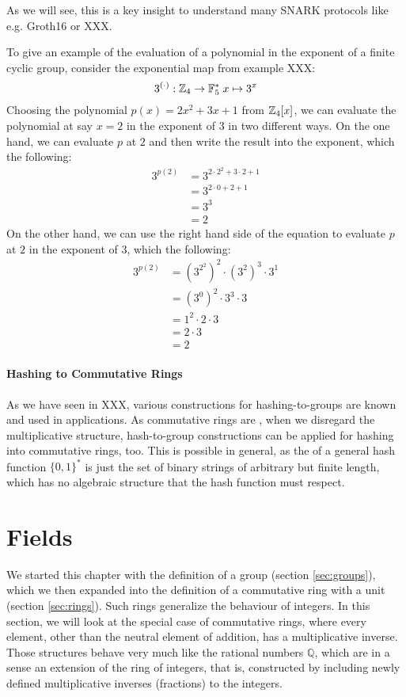 As we will see, this is a key insight to understand many SNARK protocols like e.g. Groth16 \citep{Groth16} or XXX.
\begin{example} To give an example of the evaluation of a polynomial in the exponent of a finite cyclic group, consider the exponential map from example XXX:
$$
3^{(\cdot)}: \mathbb{Z}_4 \to \mathbb{F}_5^* \; x \mapsto 3^x
$$
 Choosing the polynomial $p(x)= 2x^2 +3x +1$ from $\mathbb{Z}_4[x]$, we can evaluate the polynomial at say $x=2$ in the exponent of $3$ in two different ways. On the one hand, we can evaluate $p$ at $2$ and then write the result into the exponent, which  the following:
\begin{align*}
3^{p(2)} &=3^{2\cdot 2^2+3\cdot 2 +1}\\
          & = 3^{2\cdot 0 +2 +1}\\
          & = 3^{3}\\
          & = 2
\end{align*}
On the other hand, we can use the right hand side of the equation to evaluate $p$ at $2$ in the exponent of $3$, which  the following:
\begin{align*}
3^{p(2)} &= \left(3^{2^2}\right)^2 \cdot \left(3^{2}\right)^3\cdot 3^1\\
         &= \left(3^{0}\right)^2 \cdot 3^3\cdot 3\\
         &= 1^2 \cdot 2 \cdot 3\\
         &= 2 \cdot 3\\
         &= 2
\end{align*}
\end{example}
\paragraph{Hashing to Commutative Rings} As we have seen in XXX, various constructions for hashing-to-groups are known and used in applications. As commutative rings are , when we disregard the multiplicative structure, hash-to-group constructions can be applied for hashing into commutative rings, too. This is possible in general, as the  of a general hash function $\{0,1\}^*$ is just the set of binary strings of arbitrary but finite length, which has no algebraic structure that the hash function must respect.

\section{Fields}\label{sec:fields}
We started this chapter with the definition of a group (section \ref{sec:groups}), which we then expanded into the definition of a commutative ring with a unit (section \ref{sec:rings}). Such rings generalize the behaviour of integers. In this section, we will look at the special case of commutative rings, where every element, other than the neutral element of addition, has a multiplicative inverse. Those structures behave very much like the rational numbers $\mathbb{Q}$, which are in a sense an extension of the ring of integers, that is, constructed by including newly defined multiplicative inverses (fractions) to the integers.

